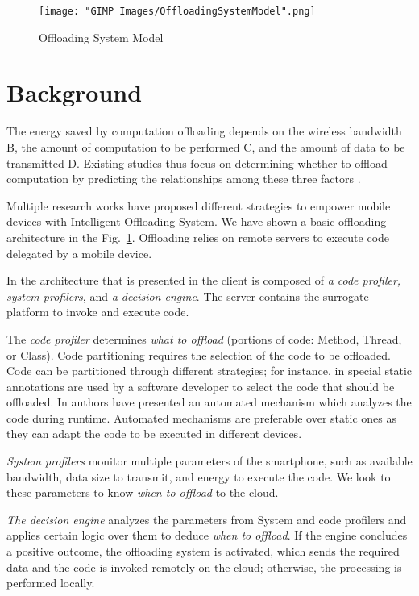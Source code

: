 \documentclass{report}
\begin{document}
\begin{figure}[h]
  \centering
  \texttt{[image: "GIMP Images/OffloadingSystemModel".png]}
  \caption{Offloading System Model}
  \label{fig:OffloadingSystemModel}
\end{figure}

\section{Background}

The energy saved by computation offloading depends on the wireless bandwidth B, the amount of computation to be performed C, and the amount of data to be transmitted D. Existing studies thus focus on determining whether to offload computation by predicting
the relationships among these three factors \cite{kumar2010cloud}.

Multiple research works have proposed different strategies to empower mobile devices with Intelligent Offloading System.
We have shown a basic offloading architecture in the Fig.~\ref{fig:OffloadingSystemModel}. Offloading relies on remote servers to execute code delegated by a mobile device.

In the architecture that is presented in \cite{flores2015mobile} the client is composed of \textit{a code profiler, system profilers}, and \textit{a decision engine}. The server contains the surrogate platform to invoke and execute code.

The \textit{code profiler} determines \textit{what to offload} (portions of code: Method, Thread, or Class). Code partitioning
requires the selection of the code to be offloaded. Code can be partitioned through different strategies; for instance, in \cite{cuervo2010maui} special static annotations are used by a software developer to select the code that should be offloaded. In \cite{chun2011clonecloud} authors have presented an automated mechanism which analyzes the code during runtime. Automated mechanisms are preferable over static ones as they can adapt the code to be executed in different devices.  

\textit{System profilers} monitor multiple parameters of the smartphone, such as available bandwidth, data size to transmit, and
energy to execute the code. We look to these parameters to know \textit{when to offload} to the cloud. 

\textit{The decision engine} analyzes the parameters from System and code profilers and applies certain logic over them to deduce \textit{when to offload}. If the engine concludes a positive outcome, the offloading system is activated, which sends the required data and the code is invoked remotely on the cloud; otherwise, the processing is performed locally.
\end{document}
